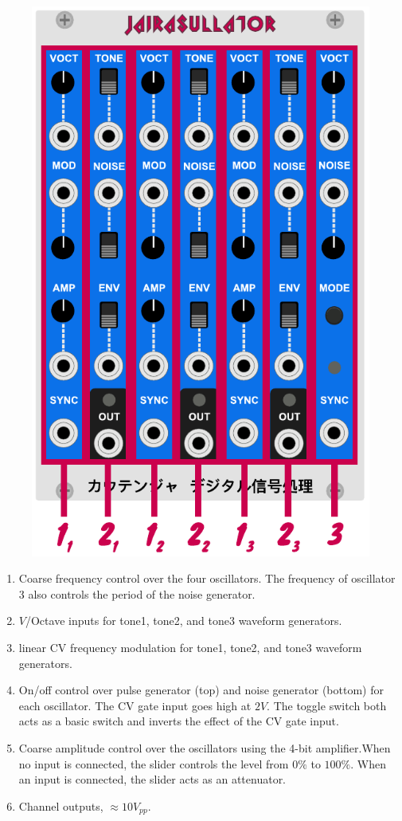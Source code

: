 \documentclass[12pt,letter]{article}
\begin{document}
\begin{figure}[!htp]
\centering
\includegraphics{Jairasullator-Manual}
\end{figure}

\begin{enumerate}
  \item Coarse frequency control over the four oscillators. The frequency of oscillator 3 also controls the period of the noise generator.
  \item $V$/Octave inputs for tone1, tone2, and tone3 waveform generators.
  \item linear CV frequency modulation for tone1, tone2, and tone3 waveform generators.
  \item On/off control over pulse generator (top) and noise generator (bottom) for each oscillator. The CV gate input goes high at $2V$. The toggle switch both acts as a basic switch and inverts the effect of the CV gate input.
  \item Coarse amplitude control over the oscillators using the 4-bit amplifier.When no input is connected, the slider controls the level from $0\%$ to $100\%$. When an input is connected, the slider acts as an attenuator.
  \item Channel outputs, ${\approx}10V_{pp}$.
\end{enumerate}


\clearpage
\renewcommand\refname{References \& Acknowledgments}
\nocite{*}


\end{document}
